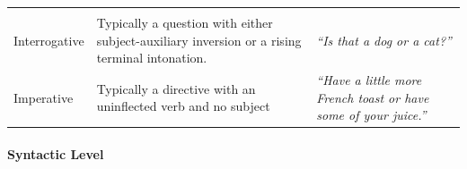 \documentclass[oneside]{report}
\theoremstyle{definition}
\theoremstyle{definition}
\theoremstyle{definition}
\theoremstyle{remark}
\begin{document}
\begin{longtable}[]{@{}lll@{}}
\begin{minipage}[t]{0.38\columnwidth}
\end{minipage}\tabularnewline
\begin{minipage}[t]{0.16\columnwidth}\raggedright\strut
Interrogative\strut
\end{minipage} & \begin{minipage}[t]{0.38\columnwidth}\raggedright\strut
Typically a question with either subject-auxiliary inversion or a rising
terminal intonation.\strut
\end{minipage} & \begin{minipage}[t]{0.38\columnwidth}\raggedright\strut
\emph{``Is that a dog or a cat?''}\strut
\end{minipage}\tabularnewline
\begin{minipage}[t]{0.16\columnwidth}\raggedright\strut
Imperative\strut
\end{minipage} & \begin{minipage}[t]{0.38\columnwidth}\raggedright\strut
Typically a directive with an uninflected verb and no subject\strut
\end{minipage} & \begin{minipage}[t]{0.38\columnwidth}\raggedright\strut
\emph{``Have a little more French toast or have some of your
juice.''}\strut
\end{minipage}\tabularnewline
\bottomrule
\end{longtable}
\paragraph{Syntactic Level}\label{syntactic-level}
\end{document}
